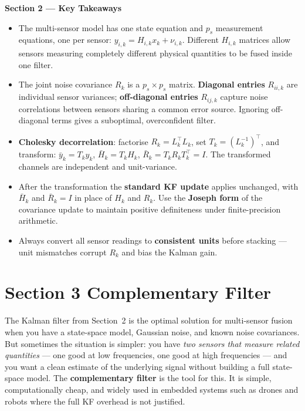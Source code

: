 \documentclass[12pt, a4paper]{article}
\begin{document}
\begin{keybox}
  \textbf{Section 2 --- Key Takeaways}
  \begin{itemize}[leftmargin=1.2em, itemsep=2pt]
    \item The multi-sensor model has one state equation and $p_s$
      measurement equations, one per sensor:
      $y_{i,k} = H_{i,k} x_k + \nu_{i,k}$.
      Different $H_{i,k}$ matrices allow sensors measuring completely
      different physical quantities to be fused inside one filter.

    \item The joint noise covariance $R_k$ is a $p_s \times p_s$ matrix.
      \textbf{Diagonal entries} $R_{ii,k}$ are individual sensor variances;
      \textbf{off-diagonal entries} $R_{ij,k}$ capture noise correlations
      between sensors sharing a common error source.
      Ignoring off-diagonal terms gives a suboptimal, overconfident filter.

    \item \textbf{Cholesky decorrelation}: factorise $R_k = L_k^\top L_k$,
      set $T_k = (L_k^{-1})^\top$, and transform:
      $\bar{y}_k = T_k y_k$,\; $\bar{H}_k = T_k H_k$,\;
      $\bar{R}_k = T_k R_k T_k^\top = I$.
      The transformed channels are independent and unit-variance.

    \item After the transformation the \textbf{standard KF update} applies
      unchanged, with $\bar{H}_k$ and $\bar{R}_k = I$ in place of $H_k$
      and $R_k$.
      Use the \textbf{Joseph form} of the covariance update to maintain
      positive definiteness under finite-precision arithmetic.

    \item Always convert all sensor readings to \textbf{consistent units}
      before stacking --- unit mismatches corrupt $R_k$ and bias the
      Kalman gain.
  \end{itemize}
\end{keybox}

\newpage
\section*{Section 3 \quad Complementary Filter}

The Kalman filter from Section~2 is the optimal solution for multi-sensor
fusion when you have a state-space model, Gaussian noise, and known noise
covariances.
But sometimes the situation is simpler: you have \emph{two sensors that
measure related quantities} --- one good at low frequencies, one good at high
frequencies --- and you want a clean estimate of the underlying signal without
building a full state-space model.
The \textbf{complementary filter} is the tool for this.
It is simple, computationally cheap, and widely used in embedded systems such
as drones and robots where the full KF overhead is not justified.
\end{document}
